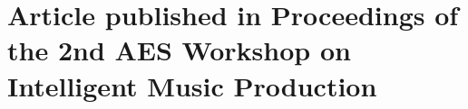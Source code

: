 
\chapter{Article published in Proceedings of the 2nd AES Workshop on Intelligent Music Production}
\label{appendix:jordal_paper}

